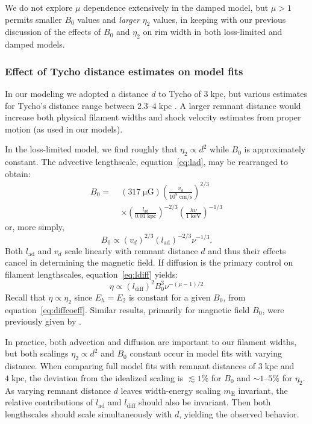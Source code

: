 \documentclass[manuscript]{aastex}  %
\newcommand*{\mt}{\mathrm}
\newcommand*{\unit}[1]{\;\mt{#1}}  %
\newcommand*{\abt}{\mathord{\sim}} %
\newcommand*{\mE}{m_\mt{E}}
\newcommand*{\muG}{\unit{\mu G}}
\begin{document}
We do not explore $\mu$ dependence extensively in the damped model, but
$\mu > 1$ permits smaller $B_0$ values and \emph{larger} $\eta_2$ values, in
keeping with our previous discussion of the effects of $B_0$ and $\eta_2$ on
rim width in both loss-limited and damped models.

\subsubsection{Effect of Tycho distance estimates on model fits}

In our modeling we adopted a distance $d$ to Tycho of $3 \unit{kpc}$, but
various estimates for Tycho's distance range between $2.3$--$4 \unit{kpc}$
\citep{hayato2010}.  A larger remnant distance would increase both physical
filament widths and shock velocity estimates from proper motion (as used in our
models).

In the loss-limited model, we find roughly that $\eta_2 \propto d^2$ while
$B_0$ is approximately constant.  The advective lengthscale,
equation~\eqref{eq:lad}, may be rearranged to obtain:
\begin{align}
    B_0 =\; &(317 \muG) \left(\frac{v_d}{10^8 \unit{cm/s}}\right)^{2/3}
                \nonumber \\
            &\times \left(\frac{l_{\mt{ad}}}{0.01 \unit{kpc}}\right)^{-2/3}
                \left(\frac{h\nu}{1 \unit{keV}}\right)^{-1/3}
\end{align}
or, more simply,
\begin{equation}
    B_0 \propto \left(v_d\right)^{2/3}
                \left(l_{\mt{ad}}\right)^{-2/3} \nu^{-1/3} .
\end{equation}
Both $l_{\mt{ad}}$ and $v_d$ scale linearly with remnant distance $d$ and thus
their effects cancel in determining the magnetic field.  If diffusion is the
primary control on filament lengthscales, equation~\eqref{eq:ldiff} yields:
\begin{equation}
    \eta \propto \left(l_{\mt{diff}}\right)^2 B_0^{3} \nu^{-(\mu - 1)/2}
\end{equation}
Recall that $\eta \propto \eta_2$ since $E_h = E_2$ is constant for a given
$B_0$, from equation~\eqref{eq:diffcoeff}.  Similar results, primarily for
magnetic field $B_0$, were previously given by \citet{parizot2006}.

In practice, both advection and diffusion are important to our filament widths,
but both scalings $\eta_2 \propto d^2$ and $B_0$ constant occur in model fits
with varying distance.  When comparing full model fits with remnant distances
of $3 \unit{kpc}$ and $4 \unit{kpc}$, the deviation from the idealized scaling
is $\lesssim 1 \%$ for $B_0$ and $\abt 1$--$5\%$ for $\eta_2$.  As varying
remnant distance $d$ leaves width-energy scaling $\mE$ invariant, the relative
contributions of $l_{\mt{ad}}$ and $l_{\mt{diff}}$ should also be invariant.
Then both lengthscales should scale simultaneously with $d$, yielding the
observed behavior.
\end{document}
